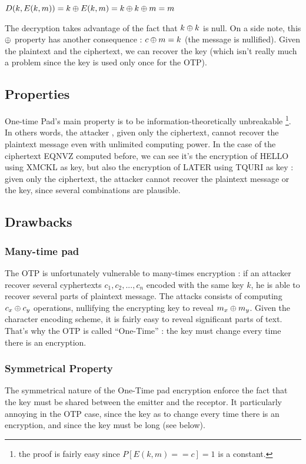 \begin{mytheorem}
    $ D(k, E(k,m) ) = k \oplus E(k,m) = k \oplus k \oplus m = m $
\end{mytheorem}

The decryption takes advantage of the fact that $k \oplus k$ is null. On a side note, this $\oplus$ property has another consequence : $ c \oplus m = k $ (the message is nullified). Given the plaintext and the ciphertext, we can recover the key (which isn't really much a problem since the key is used only once for the OTP).

\subsection{Properties}

One-time Pad's main property is to be information-theoretically unbreakable \footnote{the proof is fairly easy since $P[E(k,m) == c] = 1$ is a constant.}. In others words, the attacker , given only the ciphertext, cannot recover the plaintext message even with unlimited computing power. In the case of the ciphertext EQNVZ computed before, we can see it's the encryption of HELLO using XMCKL as key, but also the encryption of LATER using TQURI as key : given only the ciphertext, the attacker cannot recover the plaintext message or the key, since several combinations are plausible.
	
\subsection{Drawbacks}

\subsubsection{Many-time pad}
The OTP is unfortunately vulnerable to many-times encryption : if an attacker recover several cyphertexts ${c_1,c_2,...,c_n}$ encoded with the same key $k$, he is able to recover several parts of plaintext message. The attacks consists of computing $c_x\oplus c_y$ operations, nullifying the encrypting key to reveal $m_x\oplus m_y$. Given the character encoding scheme, it is fairly easy to reveal significant parts of text. That's why the OTP is called ``One-Time'' : the key must change every time there is an encryption. 

\subsubsection{Symmetrical Property}
The symmetrical nature of the One-Time pad encryption enforce the fact that the key must be shared between the emitter and the receptor. It particularly annoying in the OTP case, since the key as to change every time there is an encryption, and since the key must be long (see below).

